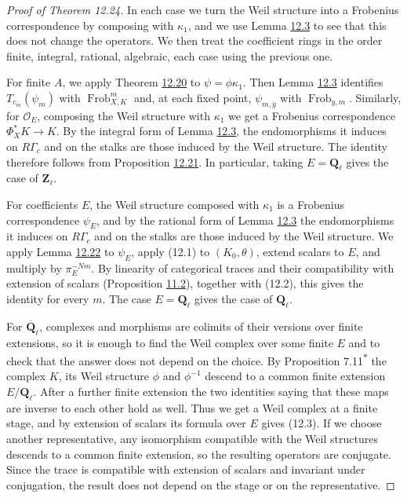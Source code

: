 \documentclass[11pt]{article}
\newcommand{\bpout}[1]{#1\textsuperscript{\hyperlink{bp-outside}{\ensuremath{\ast}}}}
\begin{document}
\begin{proof}[{Proof of Theorem 12.24}]\label{bp300}%
In each case we turn the Weil structure into a Frobenius correspondence by composing with \(\kappa_1\), and we use Lemma \hyperref[bp234]{12.3} to see that this does not change the operators. We then treat the coefficient rings in the order finite, integral, rational, algebraic, each case using the previous one.

For finite \(A\), we apply Theorem \hyperref[bp287]{12.20} to \(\psi=\phi\kappa_1\). Then Lemma \hyperref[bp234]{12.3} identifies \(T_{c_m}(\psi_m)\) with \(\operatorname{Frob}_{X,K}^m\) and, at each fixed point, \(\psi_{m,\bar y}\) with \(\operatorname{Frob}_{y,m}\). Similarly, for \(\mathcal O_E\), composing the Weil structure with \(\kappa_1\) we get a Frobenius correspondence \(\Phi_X^*K\to K\). By the integral form of Lemma \hyperref[bp234]{12.3}, the endomorphisms it induces on \(R\Gamma_c\) and on the stalks are those induced by the Weil structure. The identity therefore follows from Proposition \hyperref[bp291]{12.21}. In particular, taking \(E=\mathbf Q_\ell\) gives the case of \(\mathbf Z_\ell\).

For coefficients \(E\), the Weil structure composed with \(\kappa_1\) is a Frobenius correspondence \(\psi_E\), and by the rational form of Lemma \hyperref[bp234]{12.3} the endomorphisms it induces on \(R\Gamma_c\) and on the stalks are those induced by the Weil structure. We apply Lemma \hyperref[bp294]{12.22} to \(\psi_E\), apply (12.1) to \((K_0,\theta)\), extend scalars to \(E\), and multiply by \(\pi_E^{-Nm}\). By linearity of categorical traces and their compatibility with extension of scalars (Proposition \hyperref[bp176]{11.2}), together with (12.2), this gives the identity for every \(m\). The case \(E=\mathbf Q_\ell\) gives the case of \(\mathbf Q_\ell\).

For \(\overline{\mathbf Q}_\ell\), complexes and morphisms are colimits of their versions over finite extensions, so it is enough to find the Weil complex over some finite \(E\) and to check that the answer does not depend on the choice. By Proposition \bpout{7.11} the complex \(K\), its Weil structure \(\phi\) and \(\phi^{-1}\) descend to a common finite extension \(E/\mathbf Q_\ell\). After a further finite extension the two identities saying that these maps are inverse to each other hold as well. Thus we get a Weil complex at a finite stage, and by extension of scalars its formula over \(E\) gives (12.3). If we choose another representative, any isomorphism compatible with the Weil structures descends to a common finite extension, so the resulting operators are conjugate. Since the trace is compatible with extension of scalars and invariant under conjugation, the result does not depend on the stage or on the representative.


\end{proof}
\end{document}
